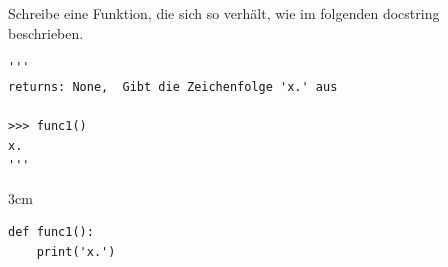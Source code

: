 
\question[1]
Schreibe eine Funktion, die sich so verhält, wie im folgenden docstring beschrieben.

 
\begin{lstlisting}
'''
returns: None,  Gibt die Zeichenfolge 'x.' aus   

>>> func1()
x.
'''
\end{lstlisting}
 

\begin{solutionbox}{3cm}
\begin{lstlisting}
def func1():
    print('x.')
\end{lstlisting}
\end{solutionbox}
